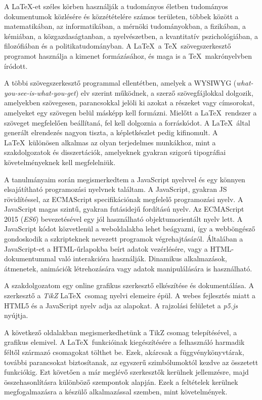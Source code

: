 
A \LaTeX\cite{latex}\cite{latexlamport}-et széles körben használják a tudományos életben tudományos dokumentumok közlésére és közzétételére számos területen, többek között a matematikában, az informatikában, a mérnöki tudományokban, a fizikában, a kémiában, a közgazdaságtanban, a nyelvészetben, a kvantitatív pszichológiában, a filozófiában és a politikatudományban. A \LaTeX\ a \TeX\ szövegszerkesztő programot használja a kimenet formázásához, és maga is a \TeX\ makrónyelvben íródott.

A többi szövegszerkesztő programmal ellentétben, amelyek a WYSIWYG (\textit{what-you-see-is-what-you-get}) elv szerint működnek, a szerző szövegfájlokkal dolgozik, amelyekben szövegesen, parancsokkal jelöli ki azokat a részeket vagy címsorokat, amelyeket egy szövegen belül másképp kell formázni. Mielőtt a \LaTeX\ rendszer a szöveget megfelelően beállítaná, fel kell dolgoznia a forráskódot. A \LaTeX\ által generált elrendezés nagyon tiszta, a képletkészlet pedig kifinomult. A \LaTeX\ különösen alkalmas az olyan terjedelmes munkákhoz, mint a szakdolgozatok és disszertációk, amelyeknek gyakran szigorú tipográfiai követelményeknek kell megfelelniük.

A tanulmányaim során megismerkedtem a JavaScript\cite{js} nyelvvel és egy könnyen elsajátítható programozási nyelvnek találtam. A JavaScript, gyakran JS rövidítéssel, az ECMAScript\cite{ecmascript} specifikációnak megfelelő programozási nyelv. A JavaScript magas szintű, gyakran futásidejű fordítású nyelv. Az ECMAScript 2015\cite{ecmascript6} (\textit{ES6}) bevezetésével egy jól használható  objektumorientált nyelv lett. A JavaScript kódot közvetlenül a weboldalakba lehet beágyazni, így a webböngésző gondoskodik a szkripteknek nevezett programok végrehajtásáról. Általában a JavaScript-et a HTML-űrlapokba beírt adatok vezérlésére, vagy a HTML-dokumentummal való interakcióra használják. Dinamikus alkalmazások, átmenetek, animációk létrehozására vagy adatok manipulálására is használható.

A szakdolgozatom egy online grafikus szerkesztő elkészítése és dokumentálása. A szerkesztő a \textit{TikZ} \LaTeX\ csomag nyelvi elemeire épül. A webes fejlesztés miatt a HTML5\cite{html5} és a JavaScript nyelv adja az alapokat. A rajzolási felületet a \textit{p5.js}\cite{p5js} nyújtja.

A következő oldalakban megismerkedhetünk a TikZ\cite{tikzmanual2} csomag telepítésével, a grafikus elemivel. A \LaTeX\ funkcióinak kiegészítésére a felhasználó harmadik féltől származó csomagokat tölthet be. Ezek, akárcsak a függvénykönyvtárak, további parancsokat biztosítanak, az egyszerű szimbólumoktól kezdve az összetett funkciókig. Ezt követően a már meglévő szerkesztők kerülnek jellemzésre, majd összehasonlításra különböző szempontok alapján. Ezek a feltételek kerülnek megfogalmazásra a készülő alkalmazással szemben, mint követelmények.

